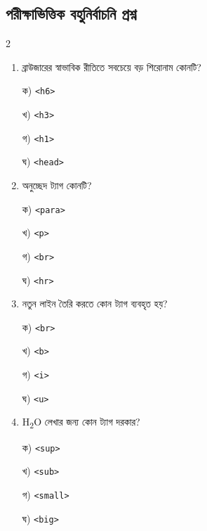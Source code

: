 \subsection{পরীক্ষাভিত্তিক বহুনির্বাচনি প্রশ্ন}

\begin{multicols}{2}
\begin{enumerate}[leftmargin=*,itemsep=5pt]
\item \begin{minipage}[t]{\linewidth}\vspace{0pt}
ব্রাউজারের স্বাভাবিক রীতিতে সবচেয়ে বড় শিরোনাম কোনটি?
\par ক) \texttt{<h6>}
\par খ) \texttt{<h3>}
\par গ) \texttt{<h1>}
\par ঘ) \texttt{<head>}
\end{minipage}

\item \begin{minipage}[t]{\linewidth}\vspace{0pt}
অনুচ্ছেদ ট্যাগ কোনটি?
\par ক) \texttt{<para>}
\par খ) \texttt{<p>}
\par গ) \texttt{<br>}
\par ঘ) \texttt{<hr>}
\end{minipage}

\item \begin{minipage}[t]{\linewidth}\vspace{0pt}
নতুন লাইন তৈরি করতে কোন ট্যাগ ব্যবহৃত হয়?
\par ক) \texttt{<br>}
\par খ) \texttt{<b>}
\par গ) \texttt{<i>}
\par ঘ) \texttt{<u>}
\end{minipage}

\item \begin{minipage}[t]{\linewidth}\vspace{0pt}
H\textsubscript{2}O লেখার জন্য কোন ট্যাগ দরকার?
\par ক) \texttt{<sup>}
\par খ) \texttt{<sub>}
\par গ) \texttt{<small>}
\par ঘ) \texttt{<big>}
\end{minipage}


\end{enumerate}
\end{multicols}

